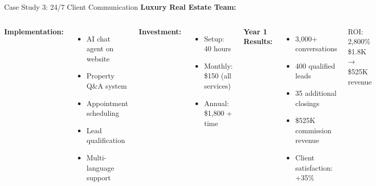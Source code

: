 \documentclass{beamer}
\begin{document}
\begin{frame}{Case Study 3: 24/7 Client Communication}
  \small
  \textbf{Luxury Real Estate Team:}
  
  \begin{columns}[onlytextwidth]
      \textbf{Implementation:}
      \begin{itemize}
        \item AI chat agent on website
        \item Property Q\&A system
        \item Appointment scheduling
        \item Lead qualification
        \item Multi-language support
      \end{itemize}
      
      \textbf{Investment:}
      \begin{itemize}
        \item Setup: 40 hours
        \item Monthly: \$150 (all services)
        \item Annual: \$1,800 + time
      \end{itemize}
    
      \textbf{Year 1 Results:}
      \begin{itemize}
        \item 3,000+ conversations
        \item 400 qualified leads
        \item 35 additional closings
        \item \$525K commission revenue
        \item Client satisfaction: +35\%
      \end{itemize}
      
      \vspace{0.3cm}
      \begin{block}{ROI: 2,800\%}
        \$1.8K → \$525K revenue
      \end{block}
  \end{columns}
\end{frame}
\end{document}
